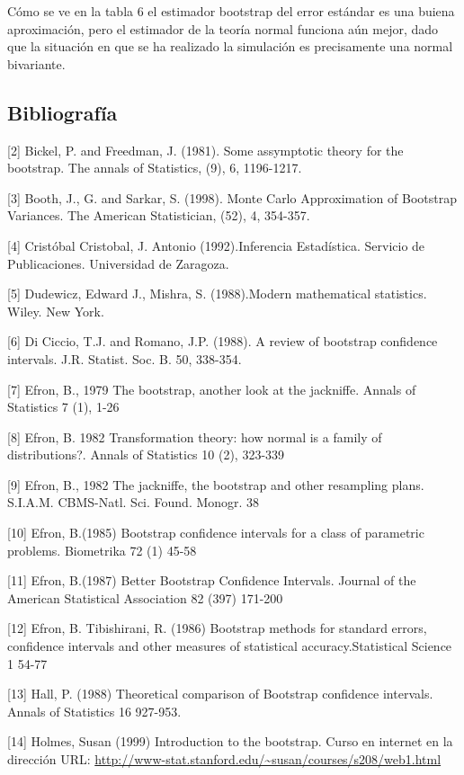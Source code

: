 \documentclass[
]{article}
\begin{document}
Cómo se ve en la tabla 6 el estimador bootstrap del error estándar es una buiena aproximación, pero el estimador de la teoría normal funciona aún mejor, dado que la situación en que se ha realizado la simulación es precisamente una normal bivariante.

\subsection{Bibliografía}\label{bibliografuxeda}

{[}2{]} Bickel, P. and Freedman, J. (1981). Some assymptotic theory for the bootstrap. The annals of Statistics, (9), 6, 1196-1217.

{[}3{]} Booth, J., G. and Sarkar, S. (1998). Monte Carlo Approximation of Bootstrap Variances. The American Statistician, (52), 4, 354-357.

{[}4{]} Cristóbal Cristobal, J. Antonio (1992).Inferencia Estadística. Servicio de Publicaciones. Universidad de Zaragoza.

{[}5{]} Dudewicz, Edward J., Mishra, S. (1988).Modern mathematical statistics. Wiley. New York.

{[}6{]} Di Ciccio, T.J. and Romano, J.P. (1988). A review of bootstrap confidence intervals. J.R. Statist. Soc. B. 50, 338-354.

{[}7{]} Efron, B., 1979 The bootstrap, another look at the jackniffe. Annals of Statistics 7 (1), 1-26

{[}8{]} Efron, B. 1982 Transformation theory: how normal is a family of distributions?. Annals of Statistics 10 (2), 323-339

{[}9{]} Efron, B., 1982 The jackniffe, the bootstrap and other resampling plans. S.I.A.M. CBMS-Natl. Sci. Found. Monogr. 38

{[}10{]} Efron, B.(1985) Bootstrap confidence intervals for a class of parametric problems. Biometrika 72 (1) 45-58

{[}11{]} Efron, B.(1987) Better Bootstrap Confidence Intervals. Journal of the American Statistical Association 82 (397) 171-200

{[}12{]} Efron, B. Tibishirani, R. (1986) Bootstrap methods for standard errors, confidence intervals and other measures of statistical accuracy.Statistical Science 1 54-77

{[}13{]} Hall, P. (1988) Theoretical comparison of Bootstrap confidence intervals. Annals of Statistics 16 927-953.

{[}14{]} Holmes, Susan (1999) Introduction to the bootstrap. Curso en internet en la dirección URL:
\url{http://www-stat.stanford.edu/~susan/courses/s208/web1.html}
\end{document}
